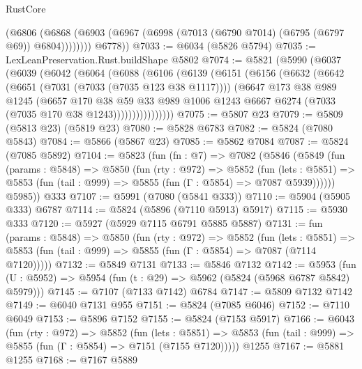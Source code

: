 \begin{lexlean}{RustCore}
\begin{coremodule}
            (@6806
              (@6868 (@6903 (@6967 (@6998 (@7013 (@6790 @7014) (@6795 (@6797 @69)) @6804))))))))
        @6778))
@7033 := @6034 (@5826 @5794)
@7035 := LexLeanPreservation.Rust.buildShape @5802
@7074 := @5821
    (@5990
      (@6037
        (@6039
          (@6042
            (@6064
              (@6088
                (@6106
                  (@6139
                    (@6151
                      (@6156
                        (@6632
                          (@6642
                            (@6651 (@7031 (@7033 (@7035 @123 @38 @1117))))
                            (@6647
                              @173
                              @38
                              @989
                              @1245
                              (@6657
                                @170
                                @38
                                @59
                                @33
                                @989
                                @1006
                                @1243
                                @6667
                                @6274
                                (@7033 (@7035 @170 @38 @1243))))))))))))))))
@7075 := @5807 @23
@7079 := @5809 (@5813 @23) (@5819 @23)
@7080 := @5828 @6783
@7082 := @5824 (@7080 @5843)
@7084 := @5866 (@5867 @23)
@7085 := @5862 @7084
@7087 := @5824 (@7085 @5892)
@7104 := @5823
    (fun (fn : @7) =>
    @7082
      (@5846
        (@5849
          (fun (params : @5848) =>
          @5850
            (fun (rty : @972) =>
            @5852
              (fun (lets : @5851) =>
              @5853 (fun (tail : @999) => @5855 (fun (Γ : @5854) => @7087 @5939))))))
        @5985))
    @333
@7107 := @5991 (@7080 (@5841 @333))
@7110 := @5904 (@5905 @333) @6787
@7114 := @5824 (@5896 (@7110 @5913) @5917)
@7115 := @5930 @333
@7120 := @5927 (@5929 @7115 @6791 @5885 @5887)
@7131 := fun (params : @5848) =>
  @5850
    (fun (rty : @972) =>
    @5852
      (fun (lets : @5851) =>
      @5853 (fun (tail : @999) => @5855 (fun (Γ : @5854) => @7087 (@7114 @7120)))))
@7132 := @5849 @7131
@7133 := @5846 @7132
@7142 := @5953 (fun (U : @5952) => @5954 (fun (t : @29) => @5962 (@5824 (@5968 @6787 @5842) @5979)))
@7145 := @7107 (@7133 @7142) @6784
@7147 := @5809 @7132 @7142
@7149 := @6040 @7131 @955
@7151 := @5824 (@7085 @6046)
@7152 := @7110 @6049
@7153 := @5896 @7152
@7155 := @5824 (@7153 @5917)
@7166 := @6043
    (fun (rty : @972) =>
    @5852
      (fun (lets : @5851) =>
      @5853 (fun (tail : @999) => @5855 (fun (Γ : @5854) => @7151 (@7155 @7120)))))
    @1255
@7167 := @5881 @1255
@7168 := @7167 @5889

\end{coremodule}
\end{lexlean}
